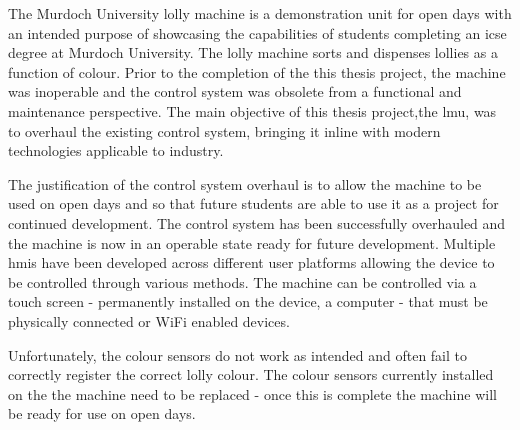 The Murdoch University lolly machine is a demonstration unit for open days with an intended purpose of showcasing the capabilities of students completing an \acrfull{icse} degree at Murdoch University. The lolly machine sorts and dispenses lollies as a function of colour.  Prior to the completion of the this thesis project, the machine was inoperable and the control system was obsolete from a functional and maintenance perspective. The main objective of this thesis project,the \acrfull{lmu}, was to overhaul the existing control system, bringing it inline with modern technologies applicable to industry. 

The justification of the control system overhaul is to allow the machine to be used on open days and so that future students are able to use it as a project for continued development. The control system has been successfully overhauled and the machine is now in an operable state ready for future development. Multiple \acrfull{hmi}s have been developed across different user platforms allowing the device to be controlled through various methods. The machine can be controlled via a touch screen -  permanently installed on the device, a computer - that must be physically connected or WiFi enabled devices. 

Unfortunately, the colour sensors do not work as intended and often fail to correctly register the correct lolly colour. The colour sensors currently installed on the the machine need to be replaced - once this is complete the machine will be ready for use on open days. 